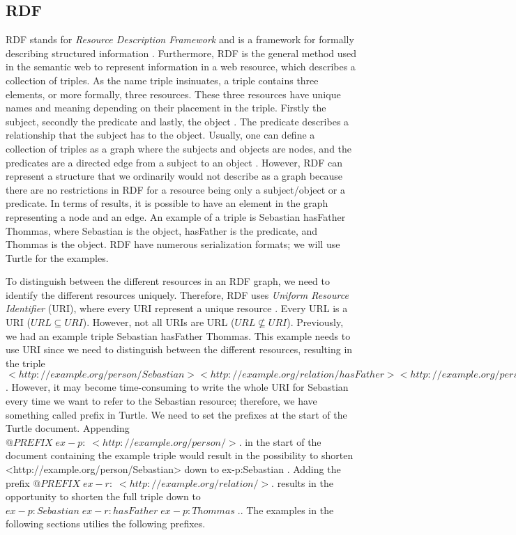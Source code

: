 \subsection{RDF}
\label{RDF}
RDF \autocite{W3C_RDF} stands for \emph{Resource Description Framework} and is a framework for formally describing structured information \autocite[19]{FOSWT}. Furthermore, RDF is the general method used in the semantic web to represent information in a web resource, which describes a collection of triples. As the name triple insinuates, a triple contains three elements, or more formally, three resources. These three resources have unique names and meaning depending on their placement in the triple. Firstly the subject, secondly the predicate and lastly, the object \autocite{W3C_RDF}. The predicate describes a relationship that the subject has to the object. Usually, one can define a collection of triples as a graph where the subjects and objects are nodes, and the predicates are a directed edge from a subject to an object \autocite{W3C_RDF}. However, RDF can represent a structure that we ordinarily would not describe as a graph because there are no restrictions in RDF for a resource being only a subject/object or a predicate. In terms of results, it is possible to have an element in the graph representing a node and an edge. An example of a triple is Sebastian hasFather Thommas, where Sebastian is the object, hasFather is the predicate, and Thommas is the object. RDF have numerous serialization formats; we will use Turtle \autocite{Turtle} for the examples.  

\para
To distinguish between the different resources in an RDF graph, we need to identify the different resources uniquely. Therefore, RDF uses \emph{Uniform Resource Identifier} (URI), where every URI represent a unique resource \autocite[21-22]{FOSWT}. Every URL is a URI ($URL\subseteq URI$). However, not all URIs are URL ($URL\nsubseteq URI$).  Previously, we had an example triple Sebastian hasFather Thommas. This example needs to use URI since we need to distinguish between the different resources, resulting in the triple $<http://example.org/person/Sebastian> <http://example.org/relation/hasFather> <http://example.org/person/Thommas> .$ . However, it may become time-consuming to write the whole URI for Sebastian every time we want to refer to the Sebastian resource; therefore, we have something called prefix in Turtle. We need to set the prefixes at the start of the Turtle document. Appending $@PREFIX\; ex-p:\; <http://example.org/person/>.$ in the start of the document containing the example triple would result in the possibility to shorten <http://example.org/person/Sebastian> down to ex-p:Sebastian . Adding the prefix $@PREFIX\; ex-r:\; <http://example.org/relation/>.$ results in the opportunity to shorten the full triple down to $ex-p:Sebastian\; ex-r:hasFather\; ex-p:Thommas\; .$. The examples in the following sections utilies the following prefixes.

